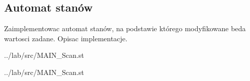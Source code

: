 \subsection{Automat stanów}
\label{lab:zad6}


Zaimplementowac automat stanów, na podstawie którego modyfikowane beda wartosci
zadane. Opisac implementacje.

\lstset{style=customc}
\ifdefined\CompileListings
    
        {../lab/src/MAIN_Scan.st}
    \newpage
\fi

\lstset{style=customc}
\ifdefined\CompileListings
    
        {../lab/src/MAIN_Scan.st}
\fi

\newpage
